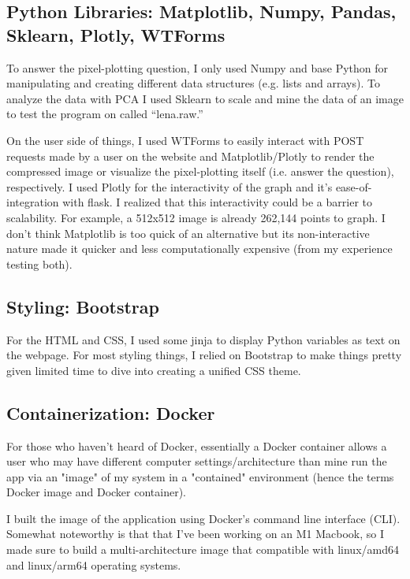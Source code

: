 \documentclass[10pt]{article}
\begin{document}
\begin{multicols*}{2}
\subsection{Python Libraries: Matplotlib, Numpy, Pandas, Sklearn, Plotly, WTForms}

To answer the pixel-plotting question, I only used Numpy and base Python for manipulating and creating different data structures (e.g. lists and arrays). To analyze the data with PCA I used Sklearn to scale and mine the data of an image to test the program on called ``lena.raw.''

On the user side of things, I used WTForms to easily interact with POST requests made by a user on the website and Matplotlib/Plotly to render the compressed image or visualize the pixel-plotting itself (i.e. answer the question), respectively. I used Plotly for the interactivity of the graph and it's ease-of-integration with flask. I realized that this interactivity could be a barrier to scalability. For example, a 512x512 image is already 262,144 points to graph. I don't think Matplotlib is too quick of an alternative but its non-interactive nature made it quicker and less computationally expensive (from my experience testing both).

\subsection{Styling: Bootstrap}

For the HTML and CSS, I used some jinja to display Python variables as text on the webpage. For most styling things, I relied on Bootstrap to make things pretty given limited time to dive into creating a unified CSS theme.

\subsection{Containerization: Docker}

For those who haven't heard of Docker, essentially a Docker container allows a user who may have different computer settings/architecture than mine run the app via an "image" of my system in a "contained" environment (hence the terms Docker image and Docker container). 

I built the image of the application using Docker's command line interface (CLI). Somewhat noteworthy is that that I've been working on an M1 Macbook, so I made sure to build a multi-architecture image that compatible with linux/amd64 and linux/arm64 operating systems. 


\end{multicols*}
\end{document}
